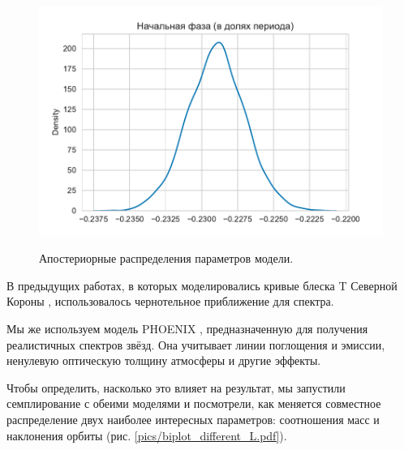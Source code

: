 \begin{figure}
{    \includegraphics[width=\fourthwidth]{pics/initial_phase.pdf}
}
\label{fig:dists}
\caption{Апостериорные распределения параметров модели.}
\end{figure}



В предыдущих работах, в которых моделировались кривые блеска T Северной Короны \cite{Shanbaz,Belczynski,Tatarnikova,Maslennikova}, использовалось чернотельное приближение для спектра.

Мы же используем модель PHOENIX \cite{PHOENIX}, предназначенную для получения реалистичных спектров звёзд. Она учитывает линии поглощения и эмиссии, ненулевую оптическую толщину атмосферы и другие эффекты.

Чтобы определить, насколько это влияет на результат, мы запустили семплирование с обеими моделями и посмотрели, как меняется совместное распределение двух наиболее интересных параметров: соотношения масс и наклонения орбиты (рис. \ref{pics/biplot_different_L.pdf}).

